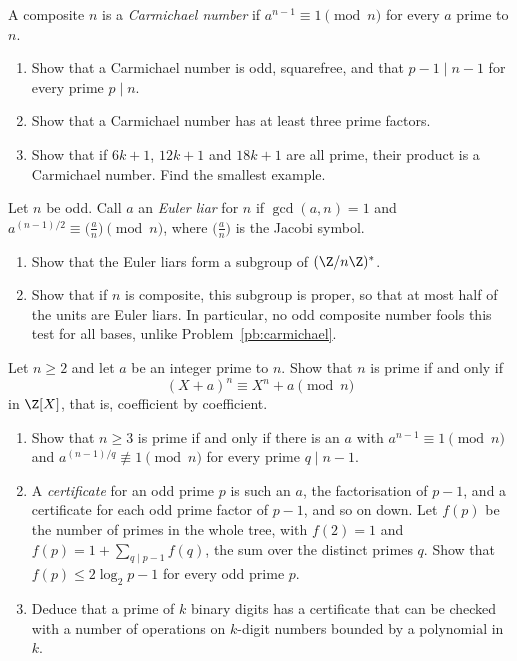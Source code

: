 \begin{exercise}[$\star\star$]\label{pb:carmichael}
A composite $n$ is a \emph{Carmichael number} if $a^{n-1}\equiv1\pmod n$ for every $a$ prime to $n$.
\begin{enumerate}[label=(\alph*)]
\item Show that a Carmichael number is odd, squarefree, and that $p-1\mid n-1$ for every prime $p\mid n$.
\item Show that a Carmichael number has at least three prime factors.
\item Show that if $6k+1$, $12k+1$ and $18k+1$ are all prime, their product is a Carmichael number. Find the smallest
example.
\end{enumerate}
\end{exercise}

\begin{exercise}[$\star\star$]\label{pb:euler}
Let $n$ be odd. Call $a$ an \emph{Euler liar} for $n$ if $\gcd(a,n)=1$ and $a^{(n-1)/2}\equiv\bigl(\frac an\bigr)\pmod n$, where
$\bigl(\frac an\bigr)$ is the Jacobi symbol.
\begin{enumerate}[label=(\alph*)]
\item Show that the Euler liars form a subgroup of $(\Z/n\Z)^*$.
\item Show that if $n$ is composite, this subgroup is proper, so that at most half of the units are Euler liars. In
particular, no odd composite number fools this test for all bases, unlike Problem~\ref{pb:carmichael}.
\end{enumerate}
\end{exercise}

\begin{exercise}[$\star\star$]\label{pb:aks}
Let $n\ge2$ and let $a$ be an integer prime to $n$. Show that $n$ is prime if and only if
\[
(X+a)^n\equiv X^n+a\pmod n
\]
in $\Z[X]$, that is, coefficient by coefficient.
\end{exercise}

\begin{exercise}[$\star\star$]\label{pb:pratt}
\begin{enumerate}[label=(\alph*)]
\item Show that $n\ge3$ is prime if and only if there is an $a$ with $a^{n-1}\equiv1\pmod n$ and $a^{(n-1)/q}\not\equiv1\pmod n$
for every prime $q\mid n-1$.
\item A \emph{certificate} for an odd prime $p$ is such an $a$, the factorisation of $p-1$, and a certificate for each odd
prime factor of $p-1$, and so on down. Let $f(p)$ be the number of primes in the whole tree, with $f(2)=1$ and
$f(p)=1+\sum_{q\mid p-1}f(q)$, the sum over the distinct primes $q$. Show that $f(p)\le2\log_2p-1$ for every odd prime $p$.
\item Deduce that a prime of $k$ binary digits has a certificate that can be checked with a number of operations on
$k$-digit numbers bounded by a polynomial in $k$.
\end{enumerate}
\end{exercise}

